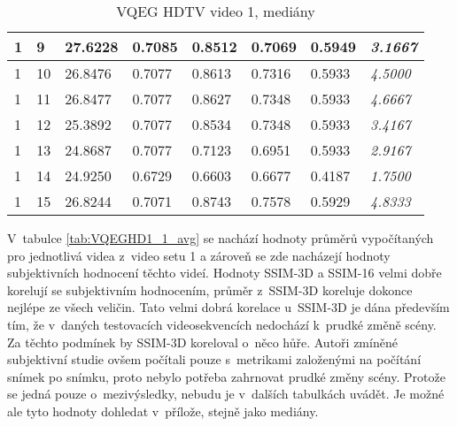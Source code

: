 \documentclass[thesis=M,czech]{FITthesis}[2016/06/26]
\begin{document}
\begin{table}[]
\begin{tabular}{|p{.85cm}|p{.85cm}|p{1.3cm}|p{1.3cm}|p{1.5cm}|p{.5cm}|p{1.5cm}|p{1.8cm}|}
1         & 9     & 27.6228       & 0.7085        & 0.8512           & 0.7069         & 0.5949           &  \textit{3.1667}      \\ \hline
1         & 10    & 26.8476       & 0.7077        & 0.8613           & 0.7316         & 0.5933           &  \textit{4.5000}      \\ \hline
1         & 11    & 26.8477       & 0.7077        & 0.8627           & 0.7348         & 0.5933           &  \textit{4.6667}      \\ \hline
1         & 12    & 25.3892       & 0.7077        & 0.8534           & 0.7348         & 0.5933           &  \textit{3.4167}      \\ \hline
1         & 13    & 24.8687       & 0.7077        & 0.7123           & 0.6951         & 0.5933           &  \textit{2.9167}      \\ \hline
1         & 14    & 24.9250       & 0.6729        & 0.6603           & 0.6677         & 0.4187           &  \textit{1.7500}      \\ \hline
1         & 15    & 26.8244       & 0.7071        & 0.8743           & 0.7578         & 0.5929           &  \textit{4.8333}      \\ \hline
\end{tabular}
\caption{VQEG HDTV video 1, mediány}
\label{tab:VQEGHD1_1_med}
\end{table}
V~tabulce \ref{tab:VQEGHD1_1_avg} se nachází hodnoty průměrů vypočítaných pro jednotlivá videa z~video setu 1 a zároveň se zde nacházejí hodnoty subjektivních hodnocení těchto videí. Hodnoty SSIM-3D a SSIM-16 velmi dobře korelují se subjektivním hodnocením, průměr z~SSIM-3D koreluje dokonce nejlépe ze všech veličin. Tato velmi dobrá korelace u~SSIM-3D je dána především tím, že v~daných testovacích videosekvencích nedochází k~prudké změně scény. Za těchto podmínek by SSIM-3D koreloval o~něco hůře. Autoři zmíněné subjektivní studie ovšem počítali pouze s~metrikami založenými na počítání snímek po snímku, proto nebylo potřeba zahrnovat prudké změny scény. Protože se jedná pouze o~mezivýsledky, nebudu je v~dalších tabulkách uvádět. Je možné ale tyto hodnoty dohledat v~přílože, stejně jako mediány.
\end{document}
